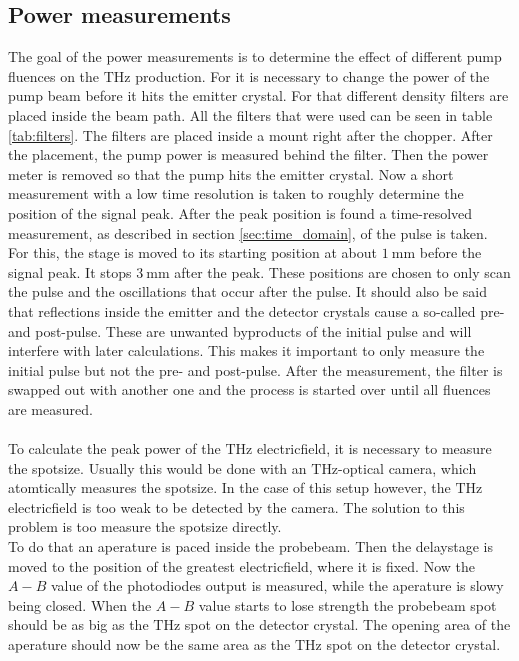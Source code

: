\subsection{Power measurements}
The goal of the power measurements is to determine the effect of different pump fluences on the $\si{\tera\hertz}$ production.
For it is necessary to change the power of the pump beam before it hits the emitter crystal.
For that different density filters are placed inside the beam path.
All the filters that were used can be seen in table \ref{tab:filters}.
The filters are placed inside a mount right after the chopper.
After the placement, the pump power is measured behind the filter.
Then the power meter is removed so that the pump hits the emitter crystal.
Now a short measurement with a low time resolution is taken to roughly determine the position of the signal peak.
After the peak position is found a time-resolved measurement, as described in section \ref{sec:time_domain}, of the pulse is taken.
For this, the stage is moved to its starting position at about $\SI{1}{\milli\meter}$ before the signal peak.
It stops $\SI{3}{\milli\meter}$ after the peak.
These positions are chosen to only scan the pulse and the oscillations that occur after the pulse.
It should also be said that reflections inside the emitter and the detector crystals cause a so-called pre- and post-pulse.
These are unwanted byproducts of the initial pulse and will interfere with later calculations.
This makes it important to only measure the initial pulse but not the pre- and post-pulse.
After the measurement, the filter is swapped out with another one and the process is started over until all fluences are measured.
\\\\
To calculate the peak power of the $\si{\tera\hertz}$ electricfield, it is necessary to measure the spotsize.
Usually this would be done with an $\si{\tera\hertz}$-optical camera, which atomtically measures the spotsize.
In the case of this setup however, the $\si{\tera\hertz}$ electricfield is too weak to be detected by the camera.
The solution to this problem is too measure the spotsize directly.
\\
To do that an aperature is paced inside the probebeam.
Then the delaystage is moved to the position of the greatest electricfield, where it is fixed.
Now the $A-B$ value of the photodiodes output is measured, while the aperature is slowy being closed.
When the $A-B$ value starts to lose strength the probebeam spot should be as big as the $\si{\tera\hertz}$ spot on the detector crystal.
The opening area of the aperature should now be the same area as the $\si{\tera\hertz}$ spot on the detector crystal.
